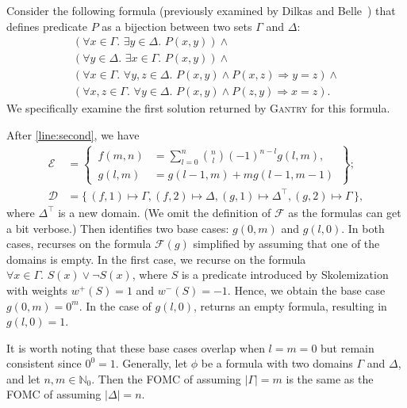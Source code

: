 \documentclass[a4paper,UKenglish,cleveref, autoref, thm-restate]{lipics-v2021}
\newcommand{\Cranetwo}{\textsc{Gantry}}
\begin{document}
\begin{example}\label{example:overall}
  Consider the following formula (previously examined by Dilkas and
  Belle~\cite{DBLP:conf/kr/DilkasB23}) that defines predicate $P$ as a bijection
  between two sets $\Gamma$ and $\Delta$:
  \[
    \begin{gathered}
      (\forall x \in \Gamma\text{. }\exists y \in \Delta\text{. }P(x, y))\land{}\\
      (\forall y \in \Delta\text{. }\exists x \in \Gamma\text{. }P(x, y))\land{}\\
      (\forall x \in \Gamma\text{. }\forall y, z \in \Delta\text{. }P(x, y) \land P(x, z) \Rightarrow y = z)\land{}\\
      (\forall x, z \in \Gamma\text{. }\forall y \in \Delta\text{. }P(x, y) \land P(z, y) \Rightarrow x = z).
    \end{gathered}
  \]
  We specifically examine the first solution returned by \Cranetwo{} for this
  formula.

  After \autoref{line:second}, we have
  \begin{align*}
    \mathcal{E} &= \left\{\,\begin{aligned}f(m, n) &= \sum_{l=0}^{n} \binom{n}{l}{(-1)}^{n-l}g(l, m),\\ g(l, m) &= g(l-1, m) + mg(l-1, m-1)\end{aligned}\,\right\};\\
    \mathcal{D} &= \{\, (f, 1) \mapsto \Gamma, (f, 2) \mapsto \Delta, (g, 1) \mapsto \Delta^{\top}, (g, 2) \mapsto \Gamma \,\},
  \end{align*}
  where $\Delta^{\top}$ is a new domain. (We omit the definition of
  $\mathcal{F}$ as the formulas can get a bit verbose.) Then \FindBaseCases
  identifies two base cases: $g(0, m)$ and $g(l, 0)$. In both cases,
  \CompileWithBaseCases recurses on the formula $\mathcal{F}(g)$ simplified by
  assuming that one of the domains is empty. In the first case, we recurse on
  the formula $\forall x \in \Gamma\text{. }S(x) \lor \neg S(x)$, where $S$ is a
  predicate introduced by Skolemization with weights $w^{+}(S) = 1$ and
  $w^{-}(S) = -1$. Hence, we obtain the base case $g(0, m) = 0^{m}$. In the case
  of $g(l, 0)$,  returns an empty formula,
  resulting in $g(l, 0) = 1$.
\end{example}

It is worth noting that these base cases overlap when $l = m = 0$ but remain
consistent since $0^{0} = 1$. Generally, let $\phi$ be a formula with two
domains $\Gamma$ and $\Delta$, and let $n, m \in \mathbb{N}_{0}$. Then the FOMC
of  assuming $|\Gamma| = m$ is the same as the
FOMC of  assuming $|\Delta| = n$.
\end{document}
